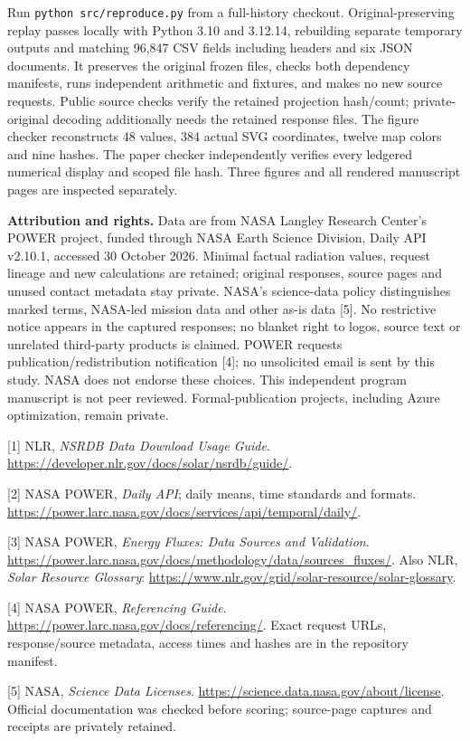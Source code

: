 \documentclass[10pt,letterpaper]{article}
\begin{document}
Run \texttt{python src/reproduce.py} from a full-history checkout. Original-preserving replay passes locally with Python 3.10 and 3.12.14, rebuilding separate temporary outputs and matching 96,847 CSV fields including headers and six JSON documents. It preserves the original frozen files, checks both dependency manifests, runs independent arithmetic and fixtures, and makes no new source requests. Public source checks verify the retained projection hash/count; private-original decoding additionally needs the retained response files. The figure checker reconstructs 48 values, 384 actual SVG coordinates, twelve map colors and nine hashes. The paper checker independently verifies every ledgered numerical display and scoped file hash. Three figures and all rendered manuscript pages are inspected separately.

\textbf{Attribution and rights.} Data are from NASA Langley Research Center's POWER project, funded through NASA Earth Science Division, Daily API v2.10.1, accessed 30 October 2026. Minimal factual radiation values, request lineage and new calculations are retained; original responses, source pages and unused contact metadata stay private. NASA's science-data policy distinguishes marked terms, NASA-led mission data and other as-is data [5]. No restrictive notice appears in the captured responses; no blanket right to logos, source text or unrelated third-party products is claimed. POWER requests publication/redistribution notification [4]; no unsolicited email is sent by this study. NASA does not endorse these choices. This independent program manuscript is not peer reviewed. Formal-publication projects, including Azure optimization, remain private.

\small
[1] NLR, \emph{NSRDB Data Download Usage Guide}. \url{https://developer.nlr.gov/docs/solar/nsrdb/guide/}.

[2] NASA POWER, \emph{Daily API}; daily means, time standards and formats. \url{https://power.larc.nasa.gov/docs/services/api/temporal/daily/}.

[3] NASA POWER, \emph{Energy Fluxes: Data Sources and Validation}. \url{https://power.larc.nasa.gov/docs/methodology/data/sources_fluxes/}. Also NLR, \emph{Solar Resource Glossary}: \url{https://www.nlr.gov/grid/solar-resource/solar-glossary}.

[4] NASA POWER, \emph{Referencing Guide}. \url{https://power.larc.nasa.gov/docs/referencing/}. Exact request URLs, response/source metadata, access times and hashes are in the repository manifest.

[5] NASA, \emph{Science Data Licenses}. \url{https://science.data.nasa.gov/about/license}. Official documentation was checked before scoring; source-page captures and receipts are privately retained.
\end{document}
